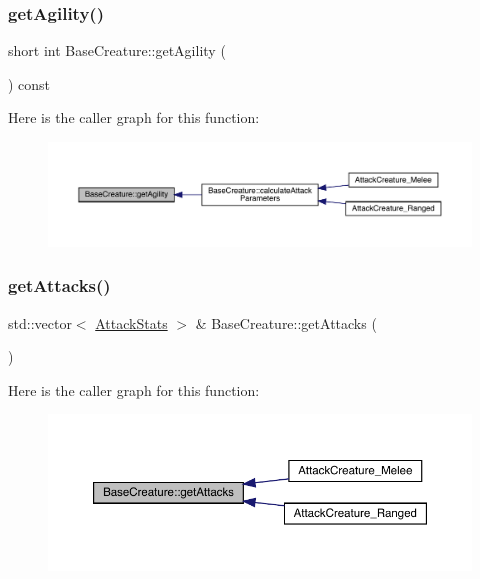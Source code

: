 \subsubsection{\texorpdfstring{get\+Agility()}{getAgility()}}
{\footnotesize\ttfamily short int Base\+Creature\+::get\+Agility (\begin{DoxyParamCaption}{ }\end{DoxyParamCaption}) const}

Here is the caller graph for this function\+:
\nopagebreak
\begin{figure}[H]
\begin{center}
\leavevmode
\includegraphics[width=350pt]{d2/d3b/class_base_creature_ac04efe1dda147e264998609635baadb6_icgraph}
\end{center}
\end{figure}
\mbox{\label{class_base_creature_ae2fdab903403a68e431baa080f715d3c}} 
\subsubsection{\texorpdfstring{get\+Attacks()}{getAttacks()}}
{\footnotesize\ttfamily std\+::vector$<$ \mbox{\hyperlink{struct_attack_stats}{Attack\+Stats}} $>$ \& Base\+Creature\+::get\+Attacks (\begin{DoxyParamCaption}{ }\end{DoxyParamCaption})}

Here is the caller graph for this function\+:
\nopagebreak
\begin{figure}[H]
\begin{center}
\leavevmode
\includegraphics[width=350pt]{d2/d3b/class_base_creature_ae2fdab903403a68e431baa080f715d3c_icgraph}
\end{center}
\end{figure}
\mbox{\label{class_base_creature_a4e3864bd12e271718a838ba6c3881f0a}} 
